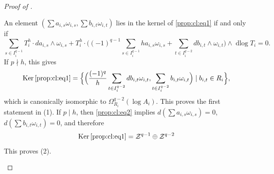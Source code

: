 \documentclass[11pt]{amsart}
\newcommand{\eq}[2]{\begin{equation}\label{#1}#2 \end{equation}}
\newcommand{\cZ}{\mathcal{Z}}
\newcommand{\Ker}{\operatorname{Ker}}
\newcommand{\dlog}{\operatorname{dlog}}
\theoremstyle{plain}
\theoremstyle{definition}
\numberwithin{equation}{prop}
\begin{document}
\begin{proof}[Proof of ]
\begin{enumerate}[label= (\alph*)]
An element
$(\sum a_{i,s}\omega_{i,s},
\sum b_{i,t}\omega_{i,t})$ lies in the kernel of \eqref{prop:cl:eq1} if and only if
\eq{prop:cl:eq2}{\sum_{s\in I_i^{q-1}} 
T_i^{h}
\cdot 
da_{i,s}\wedge\omega_{i,s}
+
T_i^{h}\cdot \Big(
(-1)^{q-1}\sum_{s\in I_i^{q-1}} ha_{i,s}\omega_{i,s}
+\sum_{t\in I_i^{q-2}}db_{i,t}\wedge\omega_{i,t}
\Big)\wedge 
\dlog T_i=0.}
If $p\nmid h$, this gives
\eq{lem3a1}{\Ker\eqref{prop:cl:eq1}
=
\Big\{\Big(
\frac{(-1)^{q}}{h}\sum_{t\in I_i^{q-2}}db_{i,t}\omega_{i,t},
\sum_{t\in I_i^{q-2}}b_{i,t}\omega_{i,t}
\Big)\mid 
b_{i,t}\in R_i
\Big\},
}
which is canonically isomorphic to $\Omega^{q-2}_{R_i}(\log A_i)$.
This proves the first statement in (1).
If $p\mid h$,
then \eqref{prop:cl:eq2} implies 
$d(\sum a_{i,s}\omega_{i,s})=0$, $d(\sum b_{i,t}\omega_{i,t})=0$, and therefore
$$\Ker\eqref{prop:cl:eq1}
=\cZ^{q-1} \oplus 
\cZ^{q-2} 
$$
This proves (2).


\end{enumerate}
\end{proof}
\end{document}
